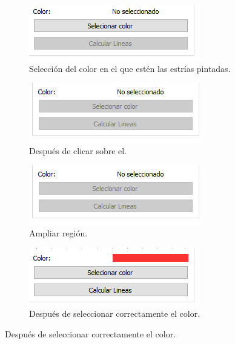 \documentclass[13pt]{book}              %
\begin{document}
{\begin{figure}
	\begin{subfigure}[c]{.5\linewidth}
	\centering\large \includegraphics[width=.9\textwidth]{selecionarColorP1}
	\caption{Selección del color en el que estén las estrías pintadas.}\label{fig:selecionarColorP1}
	\end{subfigure}%
	\begin{subfigure}[c]{.5\linewidth}
	\centering\large \includegraphics[width=.9\textwidth]{selecionarColorP2}
	\caption{Después de clicar sobre el.}
	\label{fig:selecionarColorP2}
	\end{subfigure}%
	
	\begin{subfigure}[c]{.5\linewidth}
	\centering\large \includegraphics[width=.9\textwidth]{selecionarColorP2}
	\caption{Ampliar región.}
	\label{fig:selecionarColorP3}
	\end{subfigure}%
	\begin{subfigure}[c]{.5\linewidth}
	\centering\large \includegraphics[width=.9\textwidth]{selecionarColorP4}
	\caption{Después de seleccionar correctamente el color.}
	\label{fig:selecionarColorP4}
	\end{subfigure}%
\end{figure}

}
\end{document}
